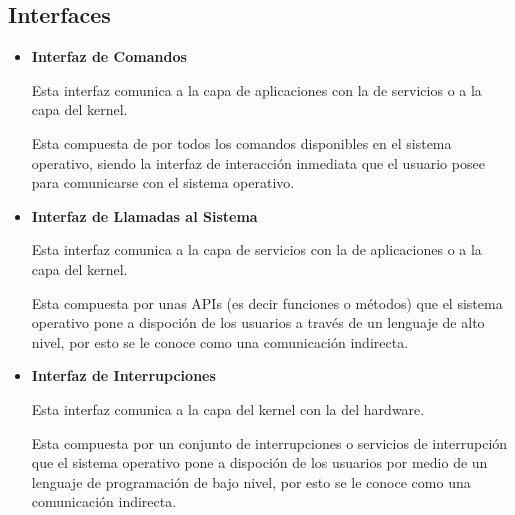 \documentclass[12pt, fleqn]{report}                             %
\begin{document}
            \subsection{Interfaces}    
                
                \begin{itemize}
                    \item
                        \textbf{Interfaz de Comandos}

                        Esta interfaz comunica a la capa de aplicaciones con la de
                        servicios o a la capa del kernel.

                        Esta compuesta de por todos los comandos disponibles en el sistema
                        operativo, siendo la interfaz de interacción inmediata que el usuario
                        posee para comunicarse con el sistema operativo.

                    \item
                        \textbf{Interfaz de Llamadas al Sistema}

                        Esta interfaz comunica a la capa de servicios con la de
                        aplicaciones o a la capa del kernel.

                        Esta compuesta por unas APIs (es decir funciones o métodos)
                        que el sistema operativo pone a dispoción de los usuarios a
                        través de un lenguaje de alto nivel, por esto se le conoce como una
                        comunicación indirecta.

                    \item
                        \textbf{Interfaz de Interrupciones}

                        Esta interfaz comunica a la capa del kernel con la del hardware.

                        Esta compuesta por un conjunto de interrupciones o servicios de 
                        interrupción que el sistema operativo pone a dispoción de los
                        usuarios por medio de un lenguaje de programación de bajo nivel,
                        por esto se le conoce como una comunicación indirecta.

                \end{itemize}



        \clearpage
\end{document}
